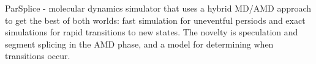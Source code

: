 \documentclass{article}
\begin{document}

\noindent\cite{perez:jctc20150parsplice} ParSplice - molecular dynamics
simulator that uses a hybrid MD/AMD approach to get the best of both worlds:
fast simulation for uneventful persiods and exact simulations for rapid
transitions to new states. The novelty is speculation and segment splicing in
the AMD phase, and a model for determining when transitions occur.

%
%
%
%
%
%
%
%
%
%
%
%
%
%
%





\newpage
\onecolumn
\appendix
\end{document}
